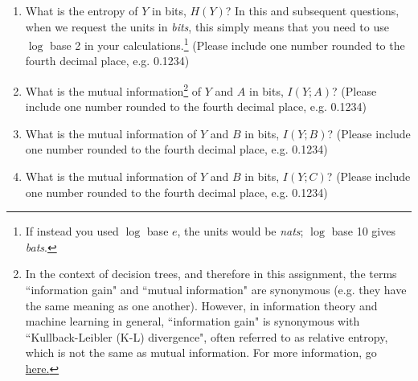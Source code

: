 \begin{enumerate}
    \item What is the entropy of $Y$ in bits, $H(Y)$? In this and subsequent questions, when we request the units in \emph{bits}, this simply means that you need to use $\log$ base 2 in your calculations.\footnote{If instead you used $\log$ base $e$, the units would be \emph{nats}; $\log$ base 10 gives \emph{bats}.}
    (Please include one number rounded to the fourth decimal place, e.g. 0.1234)
    
    \begin{tcolorbox}[fit,height=2cm,blank, borderline={1pt}{-2pt},nobeforeafter]
    \end{tcolorbox}
    

    \item What is the mutual information\footnote{In the context of decision trees, and therefore in this assignment, the terms ``information gain" and ``mutual information" are synonymous (e.g. they have the same meaning as one another). However, in information theory and machine learning in general, ``information gain" is synonymous with ``Kullback-Leibler (K-L) divergence", often referred to as relative entropy, which is not the same as mutual information. For more information, go \href{https://en.wikipedia.org/wiki/Information_gain_in_decision_trees}{here.} } 
    of $Y$ and $A$ in bits, $I(Y; A)$?
    (Please include one number rounded to the fourth decimal place, e.g. 0.1234)
    
    \begin{tcolorbox}[fit,height=2cm,blank, borderline={1pt}{-2pt},nobeforeafter]
    \end{tcolorbox}
    
    \item What is the mutual information of $Y$ and $B$ in bits, $I(Y; B)$?
    (Please include one number rounded to the fourth decimal place, e.g. 0.1234)

    \begin{tcolorbox}[fit,height=2cm,blank, borderline={1pt}{-2pt},nobeforeafter]
    \end{tcolorbox}
    
    \item What is the mutual information of $Y$ and $B$ in bits, $I(Y; C)$?
    (Please include one number rounded to the fourth decimal place, e.g. 0.1234)
    

\end{enumerate}
